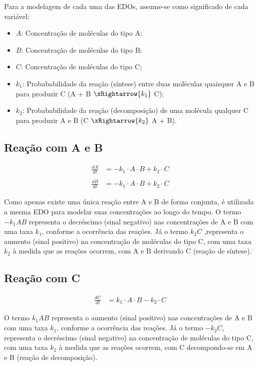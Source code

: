 \documentclass[a4paper, 12pt]{article}
\begin{document}
Para a modelagem de cada uma das EDOs, assume-se como significado de cada variável:

\begin{itemize}
    \item \(A\): Concentração de moléculas do tipo A;
    \item \(B\): Concentração de moléculas do tipo B;
    \item \(C\): Concentração de moléculas do tipo C;
    \item \(k_1\): Probababilidade da reação (síntese) entre duas moléculas quaisquer A e B para produzir C (A + B $\xRightarrow{k_1}$ C);
    \item \(k_2\): Probababilidade da reação (decomposição) de uma molécula qualquer C para produzir A e B (C $\xRightarrow{k_2}$ A + B).
\end{itemize}

\subsection*{Reação com A e B}
\begin{align*}
    \frac{dA}{dt} & = - k_1 \cdot A \cdot B + k_2 \cdot C\\
    \\ \frac{dB}{dt} & = - k_1 \cdot A \cdot B + k_2 \cdot C
\end{align*}

Como apenas existe uma única reação entre A e B de forma conjunta, é utilizada a mesma EDO para modelar suas concentrações ao longo do tempo. O termo \(-k_{1}AB\) representa o decréscimo (sinal negativo) nas concentrações de A e B com uma taxa \(k_1\), conforme a ocorrência das reações. Já o termo \(k_{2}C\) ,representa o aumento (sinal positivo) na concentração de moléculas do tipo C, com uma taxa \(k_2\) à medida que as reações ocorrem, com A e B derivando C (reação de síntese).

\subsection*{Reação com C}
\begin{align*}
    \frac{dC}{dt} & = k_1 \cdot A \cdot B - k_2 \cdot C
\end{align*}

O termo \textbf{\(k_{1}AB\)} representa o aumento (sinal positivo) nas concentrações de A e B com uma taxa \(k_1\), conforme a ocorrência das reações. Já o termo \(-k_{2}C\), representa o decréscimo (sinal negativo) na concentração de moléculas do tipo C, com uma taxa \(k_2\) à medida que as reações ocorrem, com C decompondo-se em A e B (reação de decomposição).
\end{document}
